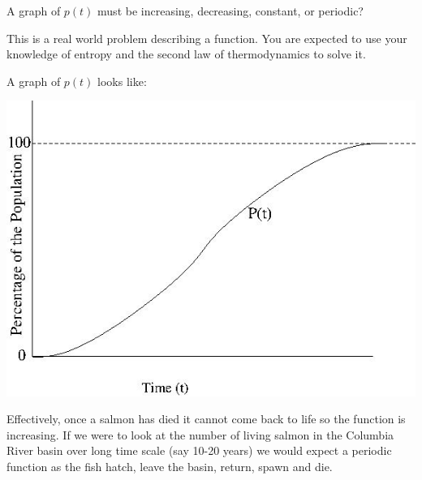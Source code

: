 \documentclass{ximera}
\author{Emma Smith Zbarsky}
\begin{document}
\begin{exercise}

A graph of $p(t)$ must be increasing, decreasing, constant, or periodic?


\begin{hint}
This is a real world problem describing a function. You are expected to
use your knowledge of entropy and the second law of thermodynamics to
solve it.
\end{hint}


\begin{hint}
A graph of $p(t)$ looks like:



\begin{image}\includegraphics{salmonpop.jpg}\end{image}



Effectively, once a salmon has died it cannot come back to life so the
function is increasing. If we were to look at the number of living
salmon in the Columbia River basin over long time scale (say 10-20
years) we would expect a periodic function as the fish hatch, leave the
basin, return, spawn and die.
\end{hint}


\begin{multipleChoice}
\end{multipleChoice}

\end{exercise}
\end{document}
